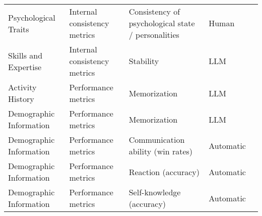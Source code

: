 \begin{small}
\begin{center}
\begin{longtable}{@{}p{}p{}p{}p{}p{}@{}}
Psychological Traits    & Internal consistency metrics        & Consistency of psychological state / personalities                                                                                          & Human             & \cite{cai2024digital} \\
Skills and Expertise    & Internal consistency metrics        & Stability                                                                                                                                   & LLM               & \cite{shao2023character}                                                                                                                  \\
Activity History        & Performance metrics                 & Memorization                                                                                                                                & LLM               & \cite{shao2023character}                                                                                                               \\
Demographic Information & Performance metrics                 & Memorization                                                                                                                                & LLM               & \cite{10.1145/3613904.3642363}                                                                                                                     \\
Demographic Information & Performance metrics                 & Communication ability (win rates)                                                                                                           & Automatic         & \cite{liu2024roleagent}                                                                                                                   \\
Demographic Information & Performance metrics                 & Reaction (accuracy)                                                                                                                         & Automatic         & \cite{liu2024roleagent}                                                                                                               \\
Demographic Information & Performance metrics                 & Self-knowledge (accuracy)                                                                                                                   & Automatic         & \cite{liu2024roleagent}                                                                                                                   \\

\end{longtable}
\end{center}
\end{small}
